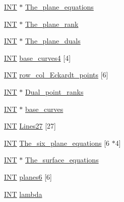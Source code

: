 \begin{DoxyCompactItemize}
\item 
\mbox{\hyperlink{galois_8h_a09fddde158a3a20bd2dcadb609de11dc}{I\+NT}} $\ast$ \mbox{\hyperlink{classarc__lifting_aa83f7de0cf8c2afb4631bcf4c7b01a1b}{The\+\_\+plane\+\_\+equations}}
\item 
\mbox{\hyperlink{galois_8h_a09fddde158a3a20bd2dcadb609de11dc}{I\+NT}} $\ast$ \mbox{\hyperlink{classarc__lifting_a18f087606cc8241b2784bb671b3b7fb8}{The\+\_\+plane\+\_\+rank}}
\item 
\mbox{\hyperlink{galois_8h_a09fddde158a3a20bd2dcadb609de11dc}{I\+NT}} $\ast$ \mbox{\hyperlink{classarc__lifting_a7a0be30a5075f2587915487a256df545}{The\+\_\+plane\+\_\+duals}}
\item 
\mbox{\hyperlink{galois_8h_a09fddde158a3a20bd2dcadb609de11dc}{I\+NT}} \mbox{\hyperlink{classarc__lifting_adbc53b7992a953f161448d0d549bff47}{base\+\_\+curves4}} \mbox{[}4\mbox{]}
\item 
\mbox{\hyperlink{galois_8h_a09fddde158a3a20bd2dcadb609de11dc}{I\+NT}} \mbox{\hyperlink{classarc__lifting_a7b36f3eecead7d120be9fc5c6619d43f}{row\+\_\+col\+\_\+\+Eckardt\+\_\+points}} \mbox{[}6\mbox{]}
\item 
\mbox{\hyperlink{galois_8h_a09fddde158a3a20bd2dcadb609de11dc}{I\+NT}} $\ast$ \mbox{\hyperlink{classarc__lifting_a1c36bdae226688e060421e772b777371}{Dual\+\_\+point\+\_\+ranks}}
\item 
\mbox{\hyperlink{galois_8h_a09fddde158a3a20bd2dcadb609de11dc}{I\+NT}} $\ast$ \mbox{\hyperlink{classarc__lifting_a69d69c816f403e4a9ff3b2cf4a4446f2}{base\+\_\+curves}}
\item 
\mbox{\hyperlink{galois_8h_a09fddde158a3a20bd2dcadb609de11dc}{I\+NT}} \mbox{\hyperlink{classarc__lifting_abb3b06fa5d8893ad281267c15e6d7c40}{Lines27}} \mbox{[}27\mbox{]}
\item 
\mbox{\hyperlink{galois_8h_a09fddde158a3a20bd2dcadb609de11dc}{I\+NT}} \mbox{\hyperlink{classarc__lifting_a143fc977580a749b691b29cf1ed97b45}{The\+\_\+six\+\_\+plane\+\_\+equations}} \mbox{[}6 $\ast$4\mbox{]}
\item 
\mbox{\hyperlink{galois_8h_a09fddde158a3a20bd2dcadb609de11dc}{I\+NT}} $\ast$ \mbox{\hyperlink{classarc__lifting_aaaff4be6b4739473e5a551c0ec2c7b8c}{The\+\_\+surface\+\_\+equations}}
\item 
\mbox{\hyperlink{galois_8h_a09fddde158a3a20bd2dcadb609de11dc}{I\+NT}} \mbox{\hyperlink{classarc__lifting_a84dee704f9bbc6c5a6bda20bd1be44b7}{planes6}} \mbox{[}6\mbox{]}
\item 
\mbox{\hyperlink{galois_8h_a09fddde158a3a20bd2dcadb609de11dc}{I\+NT}} \mbox{\hyperlink{classarc__lifting_a4ba46771f156660590aa47428607c0ff}{lambda}}

\end{DoxyCompactItemize}
